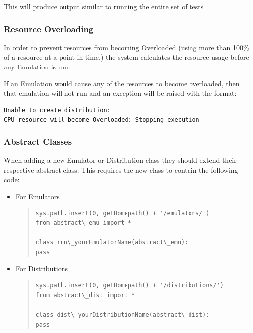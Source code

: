 \documentclass[letterpaper,10pt,english]{sphinxhowto}
\begin{document}
This will produce output similar to running the entire set of tests


\subsubsection{Resource Overloading}
\label{COCOMA/06_additional_features:resource-overloading}
In order to prevent resources from becoming Overloaded (using more than 100\% of a resource at a point in time,) the system calculates the resource usage before any Emulation is run.

If an Emulation would cause any of the resources to become overloaded, then that emulation will not run and an exception will be raised with the format:

\begin{Verbatim}[commandchars=\\\{\}]
Unable to create distribution:
CPU resource will become Overloaded: Stopping execution
\end{Verbatim}


\subsubsection{Abstract Classes}
\label{COCOMA/06_additional_features:abstract-classes}
When adding a new Emulator or Distribution class they should extend their respective abstract class. This requires the new class to contain the following code:
\begin{itemize}
\item {} 
For Emulators
\begin{quote}

\begin{Verbatim}[commandchars=\\\{\}]
sys.path.insert(0, getHomepath() + '/emulators/')
from abstract\_emu import *

class run\_yourEmulatorName(abstract\_emu):
pass
\end{Verbatim}
\end{quote}

\item {} 
For Distributions
\begin{quote}

\begin{Verbatim}[commandchars=\\\{\}]
sys.path.insert(0, getHomepath() + '/distributions/')
from abstract\_dist import *

class dist\_yourDistributionName(abstract\_dist):
pass
\end{Verbatim}
\end{quote}

\end{itemize}
\end{document}
